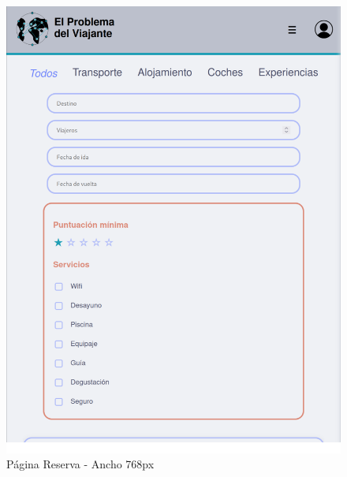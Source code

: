 \documentclass[11pt, a4paper]{book}
\begin{document}
	\begin{figure} [H]
		\centering
		\includegraphics[height=0.4\textheight]{CSS/5-5 768.png}
		\caption{Página Reserva - Ancho 768px}
	\end{figure}
\end{document}
